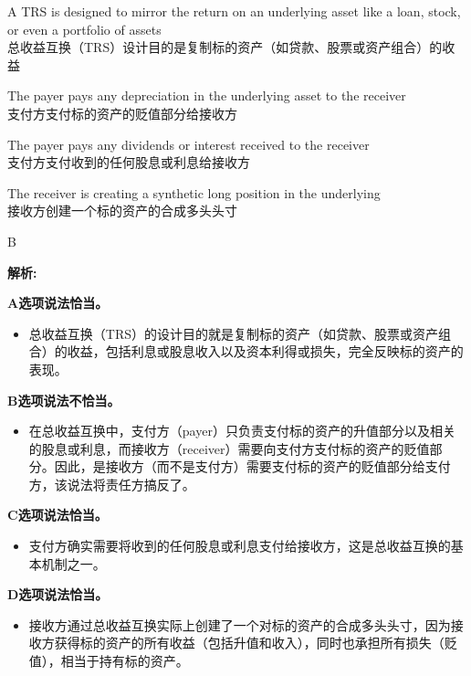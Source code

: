 \documentclass{article}
\newenvironment{explanation}
{\textbf{解析:}\par}
{\par}
\begin{document}
\begin{choices}
    \item A TRS is designed to mirror the return on an underlying asset like a loan, stock, or even a portfolio of assets\\
    总收益互换（TRS）设计目的是复制标的资产（如贷款、股票或资产组合）的收益
    \item The payer pays any depreciation in the underlying asset to the receiver\\
    支付方支付标的资产的贬值部分给接收方
    \item The payer pays any dividends or interest received to the receiver\\
    支付方支付收到的任何股息或利息给接收方
    \item The receiver is creating a synthetic long position in the underlying\\
    接收方创建一个标的资产的合成多头头寸
\end{choices}

\begin{correctanswer}
    B
\end{correctanswer}
\begin{explanation}

    \textbf{A选项说法恰当。}
    \begin{itemize}
        \item 总收益互换（TRS）的设计目的就是复制标的资产（如贷款、股票或资产组合）的收益，包括利息或股息收入以及资本利得或损失，完全反映标的资产的表现。
    \end{itemize}

    \textbf{B选项说法不恰当。}
    \begin{itemize}
        \item 在总收益互换中，支付方（payer）只负责支付标的资产的升值部分以及相关的股息或利息，而接收方（receiver）需要向支付方支付标的资产的贬值部分。因此，是接收方（而不是支付方）需要支付标的资产的贬值部分给支付方，该说法将责任方搞反了。
    \end{itemize}

    \textbf{C选项说法恰当。}
    \begin{itemize}
        \item 支付方确实需要将收到的任何股息或利息支付给接收方，这是总收益互换的基本机制之一。
    \end{itemize}

    \textbf{D选项说法恰当。}
    \begin{itemize}
        \item 接收方通过总收益互换实际上创建了一个对标的资产的合成多头头寸，因为接收方获得标的资产的所有收益（包括升值和收入），同时也承担所有损失（贬值），相当于持有标的资产。
    \end{itemize}

\end{explanation}
\end{document}
